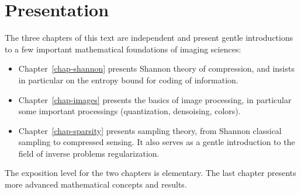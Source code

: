 
\chapter*{Presentation}

The three chapters of this text are independent and present gentle introductions to a few important mathematical foundations of imaging sciences:
\begin{itemize}
	\item Chapter~\ref{chap-shannon} presents Shannon theory of compression, and insists in particular on the entropy bound for coding of information.
	\item Chapter~\ref{chap-images} presents the basics of image processing, in particular some important processings (quantization, densoising, colors).
	\item Chapter~\ref{chap-sparsity} presents sampling theory, from Shannon classical sampling to compressed sensing. It also serves as a gentle introduction to the field of inverse problems regularization.
\end{itemize}
The exposition level for the two chapters is elementary. The last chapter presents more advanced mathematical concepts and results. 

\tableofcontents